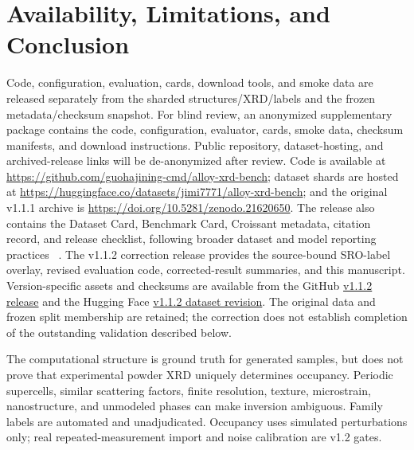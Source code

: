 \documentclass[sigconf,review,anonymous]{acmart}
\newenvironment{revision}{\ifdefined\markedcopy\color{red!70!black}\else\color{black}\fi}{}
\begin{document}
\section{Availability, Limitations, and Conclusion}

Code, configuration, evaluation, cards, download tools, and smoke data are
released separately from the sharded structures/XRD/labels and the frozen
metadata/checksum snapshot.
\ifdefined\anonymouscopy
For blind review, an anonymized supplementary package contains the code,
configuration, evaluator, cards, smoke data, checksum manifests, and download
instructions. Public repository, dataset-hosting, and archived-release links
will be de-anonymized after review.
\else
Code is available at
\url{https://github.com/guohajining-cmd/alloy-xrd-bench}; dataset shards are
hosted at \url{https://huggingface.co/datasets/jimi7771/alloy-xrd-bench}; and
the original v1.1.1 archive is \url{https://doi.org/10.5281/zenodo.21620650}.
\fi
The release also contains the Dataset Card, Benchmark Card, Croissant metadata,
citation record, and release checklist, following broader dataset and model
reporting practices
~\cite{wilkinson2016fair,gebru2021datasheets,mitchell2019modelcards}.
\begin{revision}
The v1.1.2 correction release provides the source-bound SRO-label overlay,
revised evaluation code, corrected-result summaries, and this manuscript.
Version-specific assets and checksums are available from the GitHub
\href{https://github.com/guohajining-cmd/alloy-xrd-bench/releases/tag/v1.1.2}{v1.1.2 release}
and the Hugging Face
\href{https://huggingface.co/datasets/jimi7771/alloy-xrd-bench/tree/v1.1.2}{v1.1.2 dataset revision}.
The original data and frozen split membership are retained; the correction
does not establish completion of the outstanding validation described below.
\end{revision}

The computational structure is ground truth for generated samples, but does not
prove that experimental powder XRD uniquely determines occupancy. Periodic
supercells, similar scattering factors, finite resolution, texture, microstrain,
nanostructure, and unmodeled phases can make inversion ambiguous. Family labels
are automated and unadjudicated. Occupancy uses simulated perturbations only;
real repeated-measurement import and noise calibration are v1.2 gates.
\end{document}
